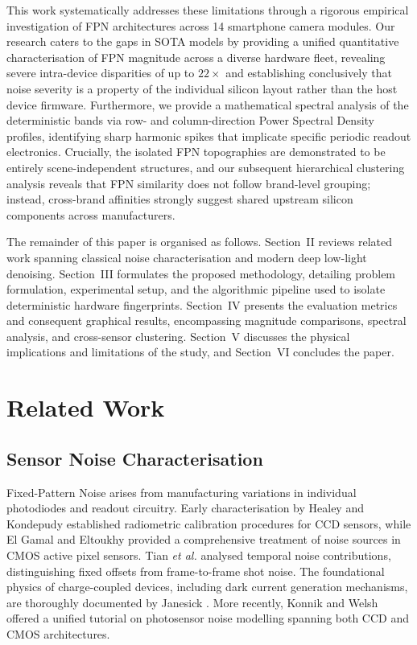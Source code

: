 \documentclass[conference]{IEEEtran}
\begin{document}
This work systematically addresses these limitations through a rigorous empirical investigation of FPN architectures across 14 smartphone camera modules. Our research caters to the gaps in SOTA models by providing a unified quantitative characterisation of FPN magnitude across a diverse hardware fleet, revealing severe intra-device disparities of up to $22\times$ and establishing conclusively that noise severity is a property of the individual silicon layout rather than the host device firmware. Furthermore, we provide a mathematical spectral analysis of the deterministic bands via row- and column-direction Power Spectral Density profiles, identifying sharp harmonic spikes that implicate specific periodic readout electronics. Crucially, the isolated FPN topographies are demonstrated to be entirely scene-independent structures, and our subsequent hierarchical clustering analysis reveals that FPN similarity does not follow brand-level grouping; instead, cross-brand affinities strongly suggest shared upstream silicon components across manufacturers.

The remainder of this paper is organised as follows. Section~II reviews related work spanning classical noise characterisation and modern deep low-light denoising. Section~III formulates the proposed methodology, detailing problem formulation, experimental setup, and the algorithmic pipeline used to isolate deterministic hardware fingerprints. Section~IV presents the evaluation metrics and consequent graphical results, encompassing magnitude comparisons, spectral analysis, and cross-sensor clustering. Section~V discusses the physical implications and limitations of the study, and Section~VI concludes the paper.

\section{Related Work}

\subsection{Sensor Noise Characterisation}

Fixed-Pattern Noise arises from manufacturing variations in individual photodiodes and readout circuitry. Early characterisation by Healey and Kondepudy \cite{healey1994radiometric} established radiometric calibration procedures for CCD sensors, while El Gamal and Eltoukhy \cite{el2005cmos} provided a comprehensive treatment of noise sources in CMOS active pixel sensors. Tian \textit{et al.} \cite{tian2001analysis} analysed temporal noise contributions, distinguishing fixed offsets from frame-to-frame shot noise. The foundational physics of charge-coupled devices, including dark current generation mechanisms, are thoroughly documented by Janesick \cite{janesick2001scientific}. More recently, Konnik and Welsh \cite{konnik2014high} offered a unified tutorial on photosensor noise modelling spanning both CCD and CMOS architectures.
\end{document}
